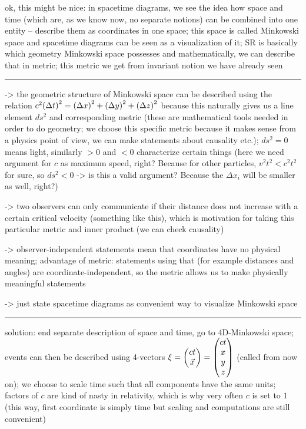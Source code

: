 ok, this might be nice: in spacetime diagrams, we see the idea how space and time (which are, as we know now, no separate notions) can be combined into one entity -- describe them as coordinates in one space; this space is called Minkowski space and spacetime diagrams can be seen as a visualization of it; SR is basically which geometry Minkowski space possesses and mathematically, we can describe that in metric; this metric we get from invariant notion we have already seen

\hrule

-> the geometric structure of Minkowski space can be described using the relation $c^2 \qty(\Delta t)^2 = \qty(\Delta x)^2 + \qty(\Delta y)^2 + \qty(\Delta z)^2$ because this naturally gives us a line element $ds^2$ and corresponding metric (these are mathematical tools needed in order to do geometry; we choose this specific metric because it makes sense from a physics point of view, we can make statements about causality etc.); $ds^2 = 0$ means light, similarly $> 0$ and $< 0$ characterize certain things (here we need argument for $c$ as maximum speed, right? Because for other particles, $v^2 t^2 < c^2 t^2$ for sure, so $ds^2 < 0$ -> is this a valid argument? Because the $\Delta x_i$ will be smaller as well, right?)

-> two observers can only communicate if their distance does not increase with a certain critical velocity (something like this), which is motivation for taking this particular metric and inner product (we can check causality)

-> observer-independent statements mean that coordinates have no physical meaning; advantage of metric: statements using that (for example distances and angles) are coordinate-independent, so the metric allows us to make physically meaningful statements

-> just state spacetime diagrams as convenient way to visualize Minkowski space

\hrule


solution: end separate description of space and time, go to 4D-Minkowski space; events can then be described using 4-vectors $\mathbf{\xi} = \mqty(c t \\ \vec{x}) = \mqty(c t \\ x \\ y \\ z)$ (called  from now on); we choose to scale time such that all components have the same units; factors of $c$ are kind of nasty in relativity, which is why very often $c$ is set to $1$ (this way, first coordinate is simply time but scaling and computations are still convenient)



